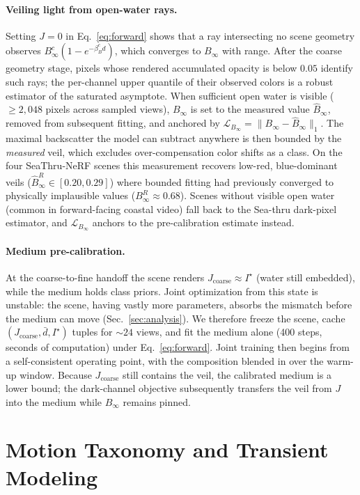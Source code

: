 \documentclass[11pt,a4paper]{article}
\newcommand{\Binf}{B_\infty}
\newcommand{\J}{J}
\newcommand{\I}{I}
\newcommand{\Lcal}{\mathcal{L}}
\begin{document}
\paragraph{Veiling light from open-water rays.}
Setting $\J = 0$ in Eq.~\eqref{eq:forward} shows that a ray intersecting no scene geometry observes $\Binf^c (1 - e^{-\beta_B^c d})$, which converges to $\Binf$ with range. After the coarse geometry stage, pixels whose rendered accumulated opacity is below $0.05$ identify such rays; the per-channel upper quantile of their observed colors is a robust estimator of the saturated asymptote. When sufficient open water is visible ($\geq 2{,}048$ pixels across sampled views), $\Binf$ is set to the measured value $\hat\Binf$, removed from subsequent fitting, and anchored by $\Lcal_{\Binf} = \|\Binf - \hat\Binf\|_1$. The maximal backscatter the model can subtract anywhere is then bounded by the \emph{measured} veil, which excludes over-compensation color shifts as a class. On the four SeaThru-NeRF \cite{levy2023seathru} scenes this measurement recovers low-red, blue-dominant veils ($\hat\Binf^R \in [0.20, 0.29]$) where bounded fitting had previously converged to physically implausible values ($\Binf^R \approx 0.68$). Scenes without visible open water (common in forward-facing coastal video) fall back to the Sea-thru \cite{akkaynak2019sea} dark-pixel estimator, and $\Lcal_{\Binf}$ anchors to the pre-calibration estimate instead.

\paragraph{Medium pre-calibration.}
At the coarse-to-fine handoff the scene renders $\J_{\text{coarse}} \approx \I^\star$ (water still embedded), while the medium holds class priors. Joint optimization from this state is unstable: the scene, having vastly more parameters, absorbs the mismatch before the medium can move (Sec.~\ref{sec:analysis}). We therefore freeze the scene, cache $(\J_{\text{coarse}}, \bar d, \I^\star)$ tuples for ${\sim}24$ views, and fit the medium alone (400 steps, seconds of computation) under Eq.~\eqref{eq:forward}. Joint training then begins from a self-consistent operating point, with the composition blended in over the warm-up window. Because $\J_{\text{coarse}}$ still contains the veil, the calibrated medium is a lower bound; the dark-channel objective subsequently transfers the veil from $\J$ into the medium while $\Binf$ remains pinned.

\section{Motion Taxonomy and Transient Modeling}
\label{sec:transients}
\end{document}
